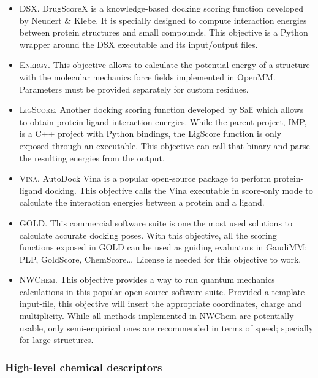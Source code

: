 \begin{itemize}
	\item \textsc{DSX}. DrugScoreX is a knowledge-based docking scoring function developed by Neudert $\&$  Klebe.\cite{neudert2011dsx} It is specially designed to compute interaction energies between protein structures and small compounds. This objective is a Python wrapper around the DSX executable and its input/output files.

	\item \textsc{Energy}. This objective allows to calculate the potential energy of a structure with the molecular mechanics force fields implemented in OpenMM. Parameters must be provided separately for custom residues.

	\item \textsc{LigScore}. Another docking scoring function developed by Sali\cite{krammer2005ligscore} which allows to obtain protein-ligand interaction energies. While the parent project, IMP,\cite{russel2012putting} is a C++ project with Python bindings, the LigScore function is only exposed through an executable. This objective can call that binary and parse the resulting energies from the output.

	\item \textsc{Vina}. AutoDock Vina\cite{trott2010autodock} is a popular open-source package to perform protein-ligand docking. This objective calls the Vina executable in score-only mode to calculate the interaction energies between a protein and a ligand.

	\item \textsc{GOLD}. This commercial software suite is one the most used solutions to calculate accurate docking poses. With this objective, all the scoring functions exposed in GOLD\cite{gold} can be used as guiding evaluators in GaudiMM: PLP, GoldScore, ChemScore\ldots\ License is needed for this objective to work.

	\item \textsc{NWChem}. This objective provides a way to run quantum mechanics calculations in this popular open-source software suite.\cite{nwchem} Provided a template input-file, this objective will insert the appropriate coordinates, charge and multiplicity. While all methods implemented in NWChem are potentially usable, only semi-empirical ones are recommended in terms of speed; specially for large structures.


\end{itemize}\subsubsection{High-level chemical descriptors}
